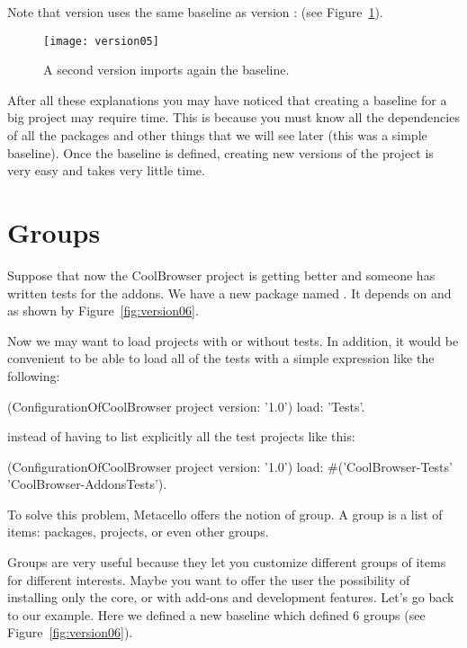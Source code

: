 \documentclass[a4paper,10pt,twoside]{book}
\begin{document}
Note that version  uses the same baseline as version :  (see Figure~\ref{fig:version05}).

\begin{figure}
\begin{center}
\texttt{[image: version05]}
\caption{A second version imports again the baseline.}\label{fig:version05}
\end{center}
\end{figure} 

After all these explanations you may have noticed that creating a baseline for a big project may require time. This is because you must know all the dependencies of all the packages and other things that we will see later (this was a simple baseline). Once the baseline is defined, creating new versions of the project is very easy and takes very little time. 

\section{Groups}
Suppose that now the CoolBrowser project is getting better and someone has written tests for the addons. We have a new package named . It depends on  and  as shown by Figure~\ref{fig:version06}.

Now we may want to load projects with or without tests. In addition, it would be convenient to be able to load all of the tests with a simple expression like the following:

\begin{code}{}
(ConfigurationOfCoolBrowser project version: '1.0') load: 'Tests'.
\end{code}

instead of having to list explicitly all the test projects like this:
 
\begin{code}{} 
(ConfigurationOfCoolBrowser project version: '1.0') 
	load: #('CoolBrowser-Tests' 'CoolBrowser-AddonsTests').
\end{code}
 
To solve this problem, Metacello offers the notion of group. A group is a list of items: packages, projects, or even other groups. 
 
Groups are very useful because they let you customize different groups of items for different interests. Maybe you want to offer the  user the possibility of installing only the core, or with add-ons and development features. Let's go back to our example. Here we defined a new baseline  which defined 6 groups (see Figure~\ref{fig:version06}). 
\end{document}
